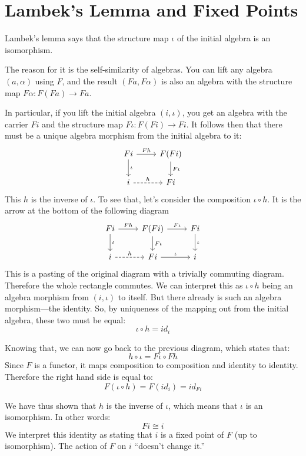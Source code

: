 \documentclass[DaoFP]{subfiles}
\begin{document}
\section{Lambek's Lemma and Fixed Points}


Lambek's lemma says that the structure map $\iota$ of the initial algebra is an isomorphism. 

The reason for it is the self-similarity of algebras. You can lift any algebra $(a, \alpha)$ using $F$, and the result $(F a, F \alpha)$ is also an algebra with the structure map $F \alpha \colon F (F a) \to F a$. 

In particular, if you lift the initial algebra $(i, \iota)$, you get an algebra with the carrier $F i$ and the structure map $F \iota \colon F (F i) \to F i$. It follows then that there must be a unique algebra morphism from the initial algebra to it:
\[
 \begin{tikzcd}
 F i 
 \arrow[r, "F h"]
 \arrow[d, "\iota"]
 & F (F i)
\arrow[d, "F \iota"]
 \\
 i
 \arrow[r, dashed, "h"]
 & F i
  \end{tikzcd}
\]
This $h$ is the inverse of $\iota$. To see that, let's consider the composition $\iota \circ h$. It is the arrow at the bottom of the following diagram
\[
 \begin{tikzcd}
 F i 
 \arrow[r, "F h"]
 \arrow[d, "\iota"]
 & F (F i)
\arrow[d, "F \iota"]
\arrow[r, "F \iota"]
& F i
\arrow[d, "\iota"]
 \\
 i
 \arrow[r, dashed, "h"]
 & F i
 \arrow[r, "\iota"]
 & i
  \end{tikzcd}
\]
This is a pasting of the original diagram with a trivially commuting diagram. Therefore the whole rectangle commutes. We can interpret this as $\iota \circ h$ being an algebra morphism from $(i, \iota)$ to itself. But there already is such an algebra morphism---the identity. So, by uniqueness of the mapping out from the initial algebra, these two must be equal:
\[ \iota \circ h = id_i \] 

Knowing that, we can now go back to the previous diagram, which states that:
\[ h \circ \iota = F \iota \circ F h \]
Since $F$ is a functor, it maps composition to composition and identity to identity. Therefore the right hand side is equal to:
\[ F (\iota \circ h) = F (id_i) = id_{F i} \]

We have thus shown that $h$ is the inverse of $\iota$, which means that $\iota$ is an isomorphism. In other words:
\[ F i \cong i \]
We interpret this identity as stating that $i$ is a fixed point of $F$ (up to isomorphism). The action of $F$ on $i$ ``doesn't change it.''
\end{document}
